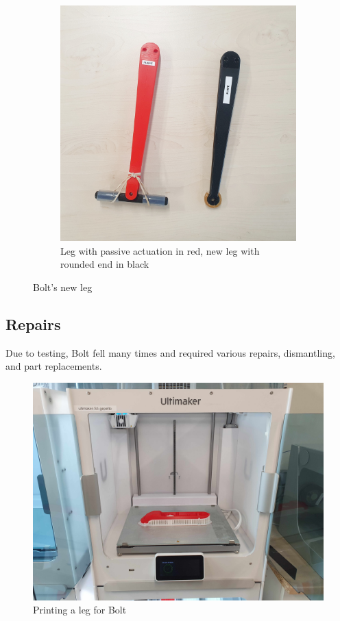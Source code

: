 \documentclass[a4paper,10pt]{article}
\begin{document}
\begin{figure}[H]
\begin{subfigure}{.5\textwidth}
  \includegraphics[width=\linewidth, angle=0, scale=0.9]{./images/Bolt_leg.jpg}
  \caption{Leg with passive actuation in red, new leg with rounded end in black}
\end{subfigure}
\caption{Bolt's new leg}
\label{new_bolt_leg}
\end{figure}



\subsection{Repairs}
Due to testing, Bolt fell many times and required various repairs, dismantling, and part replacements. 

\begin{figure}[H]
\centering
  \includegraphics[width=\linewidth, angle=0, scale=0.3]{./images/printing_S5.jpg}
  \caption{Printing a leg for Bolt}
  \label{bolt_printing_S5}
\end{figure}
\end{document}
